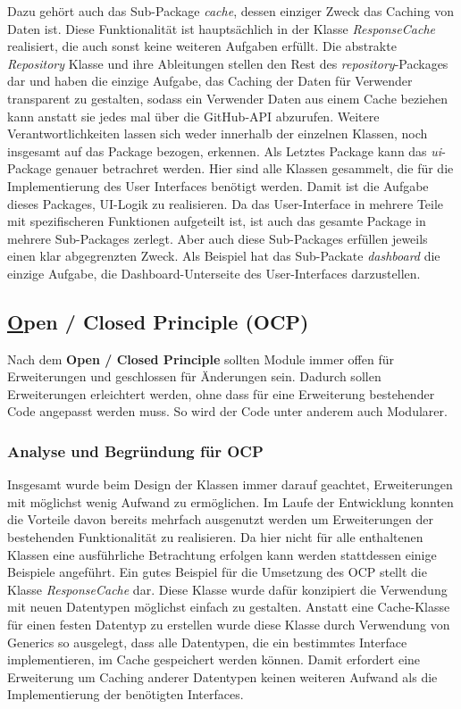 \documentclass[12pt]{article}
\begin{document}
Dazu gehört auch das Sub-Package \textit{cache}, dessen einziger Zweck das Caching von Daten ist.
Diese Funktionalität ist hauptsächlich in der Klasse \textit{ResponseCache} realisiert, die auch sonst keine weiteren Aufgaben erfüllt.
Die abstrakte \textit{Repository} Klasse und ihre Ableitungen stellen den Rest des \textit{repository}-Packages dar und haben die einzige Aufgabe, das Caching der Daten für Verwender transparent zu gestalten, sodass ein Verwender Daten aus einem Cache beziehen kann anstatt sie jedes mal über die GitHub-API abzurufen.
Weitere Verantwortlichkeiten lassen sich weder innerhalb der einzelnen Klassen, noch insgesamt auf das Package bezogen, erkennen.
\newline
Als Letztes Package kann das \textit{ui}-Package genauer betrachret werden.
Hier sind alle Klassen gesammelt, die für die Implementierung des User Interfaces benötigt werden.
Damit ist die Aufgabe dieses Packages, UI-Logik zu realisieren.
Da das User-Interface in mehrere Teile mit spezifischeren Funktionen aufgeteilt ist, ist auch das gesamte Package in mehrere Sub-Packages zerlegt.
Aber auch diese Sub-Packages erfüllen jeweils einen klar abgegrenzten Zweck.
Als Beispiel hat das Sub-Packate \textit{dashboard} die einzige Aufgabe, die Dashboard-Unterseite des User-Interfaces darzustellen.


\newpage
\subsection{\underline{O}pen / Closed Principle (OCP)}

Nach dem \textbf{Open / Closed Principle} sollten Module immer offen für Erweiterungen und geschlossen für Änderungen sein.
Dadurch sollen Erweiterungen erleichtert werden, ohne dass für eine Erweiterung bestehender Code angepasst werden muss.
So wird der Code unter anderem auch Modularer.

\subsubsection{Analyse und Begründung für OCP}
Insgesamt wurde beim Design der Klassen immer darauf geachtet, Erweiterungen mit möglichst wenig Aufwand zu ermöglichen.
Im Laufe der Entwicklung konnten die Vorteile davon bereits mehrfach ausgenutzt werden um Erweiterungen der bestehenden Funktionalität zu realisieren.
Da hier nicht für alle enthaltenen Klassen eine ausführliche Betrachtung erfolgen kann werden stattdessen einige Beispiele angeführt.
\newline
Ein gutes Beispiel für die Umsetzung des OCP stellt die Klasse \textit{ResponseCache} dar. 
Diese Klasse wurde dafür konzipiert die Verwendung mit neuen Datentypen möglichst einfach zu gestalten.
Anstatt eine Cache-Klasse für einen festen Datentyp zu erstellen wurde diese Klasse durch Verwendung von Generics so ausgelegt, dass alle Datentypen, die ein bestimmtes Interface implementieren, im Cache gespeichert werden können.
Damit erfordert eine Erweiterung um Caching anderer Datentypen keinen weiteren Aufwand als die Implementierung der benötigten Interfaces.
\newline
\end{document}
